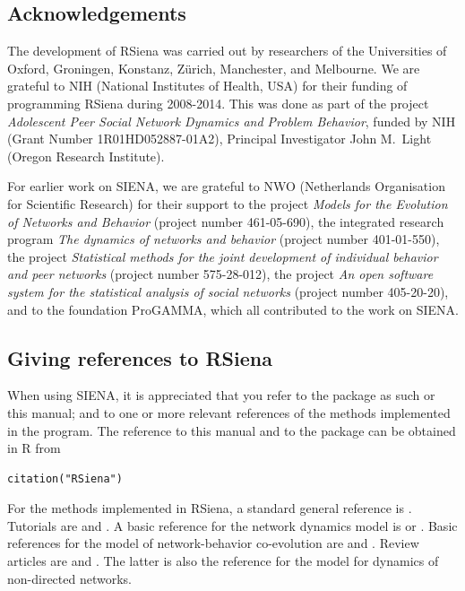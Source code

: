 \documentclass[a4paper,fleqn,11pt]{article}
\newcommand{\+}{\, + \,}
\newcommand{\R}{{\sf R }}
\newcommand{\rs}{{\sf RSiena}}
\newcommand{\RS}{{\sf \textsf{RSiena} }}
\newcommand{\si}{{\sf SIENA}}
\begin{document}
\subsection{Acknowledgements}

The development of \RS was carried out by researchers of the Universities
of Oxford, Groningen, Konstanz, Z\"{u}rich, Manchester, and Melbourne.
We are grateful to NIH (National Institutes of Health, USA)
for their funding of programming \RS during 2008-2014.
This was done
as part of the project \emph{Adolescent Peer Social Network Dynamics
and Problem Behavior}, funded by NIH (Grant Number 1R01HD052887-01A2),
Principal Investigator John M.\ Light (Oregon Research Institute).

For earlier work on \si, we are grateful to NWO (Netherlands Organisation for
Scientific Research) for their support to the project
\emph{Models for the Evolution of Networks and Behavior}
(project number 461-05-690),
the integrated research program
\emph{The dynamics of networks and behavior} (project number 401-01-550),
the project \emph{Statistical methods for the joint development of
individual behavior and peer networks} (project number 575-28-012),
the project \emph{An open software system for the statistical
analysis of social networks} (project number 405-20-20),
and to the foundation ProGAMMA,
which all contributed to the work on \si.

\newpage

\newpage

\subsection{Giving references to RSiena}

When using \si, it is appreciated that you refer to the package as such
or this manual; and to one or
more relevant references of the methods implemented in the program.  The
reference to this manual and to the package can be obtained in \R from
\begin{verbatim}
citation("RSiena")
\end{verbatim}

For the methods implemented in \rs,
a standard general reference is \citet{Snijders2017}.
Tutorials are \citet*{SnijdersEA10b} and \citet{Kalish2020}.
A basic reference for the network dynamics model is \citet{Snijders01}
or \citet{Snijders05}.
Basic references for the model of network-behavior co-evolution
are \citet*{SnijdersEA07} and \citet*{SteglichEA10}.
Review articles are \citet{Snijders2017} and \citet{SnijdersPickup17}.
The latter is also the reference for the model for dynamics
of non-directed networks.
\end{document}
